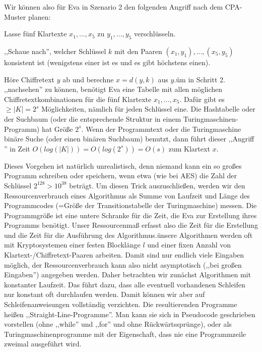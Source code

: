 \documentclass[a4paper]{article}
\begin{document}
\begin{multicols}{3}
    Wir können also für Eva in Szenario 2 den folgenden Angriff nach dem CPA-Muster planen:
    \begin{enumerate*}
        \item Lasse fünf Klartexte $x_1,...,x_5$ zu $y_1,...,y_5$ verschlüsseln.
        \item ,,Schaue nach'', welcher Schlüssel $k$ mit den Paaren $(x_1,y_1),...,(x_5,y_5)$ konsistent ist (wenigstens einer ist es und es gibt höchstens einen).
        \item Höre Chiffretext $y$ ab und berechne $x=d(y,k)$ aus $y$.üm in Schritt 2. ,,nachsehen'' zu können, benötigt Eva eine Tabelle mit allen möglichen Chiffretextkombinationen für die fünf Klartexte $x_1,...,x_5$. Dafür gibt es $\geq |K|= 2^s$ Möglichkeiten, nämlich für jeden Schlüssel eine. Die Hashtabelle oder der Suchbaum (oder die entsprechende Struktur in einem Turingmaschinen-Programm) hat Größe $2^s$. Wenn der Programmtext oder die Turingmaschine binäre Suche (oder einen binären Suchbaum) benutzt, dann führt dieser ,,Angriff '' in Zeit $O(log(|K|)) =O(log(2^s)) =O(s)$ zum Klartext $x$.
    \end{enumerate*}

    Dieses Vorgehen ist natürlich unrealistisch, denn niemand kann ein so großes Programm schreiben oder speichern, wenn etwa (wie bei AES) die Zahl der Schlüssel $2^{128}>10^{38}$ beträgt. Um diesen Trick auszuschließen, werden wir den Ressourcenverbrauch eines Algorithmus als Summe von Laufzeit und Länge des Programmcodes (=Größe der Transitionstabelle der Turingmaschine) messen. Die Programmgröße ist eine untere Schranke für die Zeit, die Eva zur Erstellung ihres Programms benötigt. Unser Ressourcenmaß erfasst also die Zeit für die Erstellung und die Zeit für die Ausführung des Algorithmus.ünsere Algorithmen werden oft mit Kryptosystemen einer festen Blocklänge $l$ und einer fixen Anzahl von Klartext-/Chiffretext-Paaren arbeiten. Damit sind nur endlich viele Eingaben möglich, der Ressourcenverbrauch kann also nicht asymptotisch (,,bei großen Eingaben'') angegeben werden. Daher betrachten wir zunächst Algorithmen mit konstanter Laufzeit. Das führt dazu, dass alle eventuell vorhandenen Schleifen nur konstant oft durchlaufen werden. Damit können wir aber auf Schleifenanweisungen vollständig verzichten. Die resultierenden Programme heißen ,,Straight-Line-Programme''. Man kann sie sich in Pseudocode geschrieben vorstellen (ohne ,,while'' und ,,for'' und ohne Rückwärtssprünge), oder als Turingmaschinenprogramme mit der Eigenschaft, dass nie eine Programmzeile zweimal ausgeführt wird.


\end{multicols}
\end{document}
